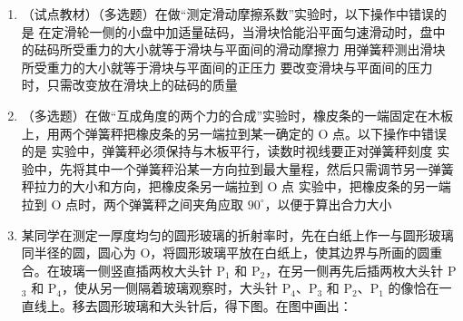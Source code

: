 \documentclass[\gkver]{gaokaozhenti}
\begin{document}
\begin{enumerate}
\item
（试点教材）（多选题）在做“测定滑动摩擦系数”实验时，以下操作中错误的是
\onepicture[align=right, w=5.85cm]{}
{在定滑轮一侧的小盘中加适量砝码，当滑块恰能沿平面匀速滑动时，盘中的砝码所受重力的大小就等于滑块与平面间的滑动摩擦力}
{用弹簧秤测出滑块所受重力的大小就等于滑块与平面间的正压力}
{要改变滑块与平面间的压力时，只需改变放在滑块上的砝码的质量}

\item
（多选题）在做“互成角度的两个力的合成”实验时，橡皮条的一端固定在木板上，用两个弹簧秤把橡皮条的另一端拉到某一确定的 O 点。以下操作中错误的是
{实验中，弹簧秤必须保持与木板平行，读数时视线要正对弹簧秤刻度}
{实验中，先将其中一个弹簧秤沿某一方向拉到最大量程，然后只需调节另一弹簧秤拉力的大小和方向，把橡皮条另一端拉到 O 点}
{实验中，把橡皮条的另一端拉到 O 点时，两个弹簧秤之间夹角应取 $90^{\circ}$，以便于算出合力大小}

\item
某同学在测定一厚度均匀的圆形玻璃的折射率时，先在白纸上作一与圆形玻璃同半径的圆，圆心为 O，将圆形玻璃平放在白纸上，使其边界与所画的圆重合。在玻璃一侧竖直插两枚大头针 P$_{1}$ 和 P$_{2}$，在另一侧再先后插两枚大头针 P$_{3}$ 和 P$_{4}$，使从另一侧隔着玻璃观察时，大头针 P$_{4}$、P$_{3}$ 和 P$_{2}$、P$_{1}$ 的像恰在一直线上。移去圆形玻璃和大头针后，得下图。在图中画出：
\onepicture[align=right, w=4.71cm]{}
\end{enumerate}
\end{document}
